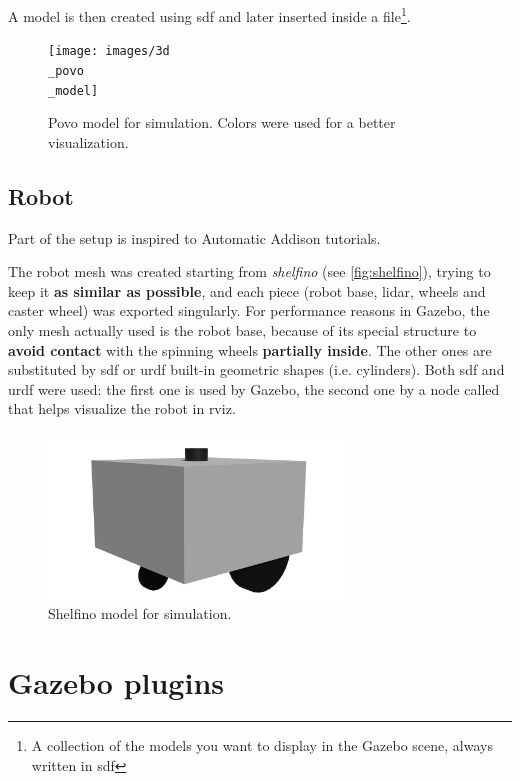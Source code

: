 A model is then created using \acrfull{sdf} and later inserted inside a  file\footnote{A collection of the models you want to display in the Gazebo scene, always written in \acrshort{sdf}}.

\begin{figure}[h]
    \centering
    \texttt{[image: images/3d\\\_povo\\\_model]}
    \caption{Povo model for simulation. Colors were used for a better visualization.}
\end{figure}

\subsection{Robot}
\label{sub:robot}

Part of the setup is inspired to Automatic Addison tutorials\cite{tutorials}.

The robot mesh was created starting from \textit{shelfino} (see \autoref{fig:shelfino}), trying to keep it \textbf{as similar as possible}, and each piece (robot base, lidar, wheels and caster wheel) was exported singularly. For performance reasons in Gazebo, the only mesh actually used is the robot base, because of its special structure to \textbf{avoid contact} with the spinning wheels \textbf{partially inside}. The other ones are substituted by \acrshort{sdf} or \acrfull{urdf} built-in geometric shapes (i.e. cylinders).
Both \acrshort{sdf} and \acrshort{urdf} were used: the first one is used by Gazebo, the second one by a node called  that helps visualize the robot in \acrshort{rviz}.

\begin{figure}[h]
    \centering
    \includegraphics[width=0.7\textwidth]{images/shelfino_3d.png}
    \caption{Shelfino model for simulation.}
\end{figure}

\section{Gazebo plugins}

